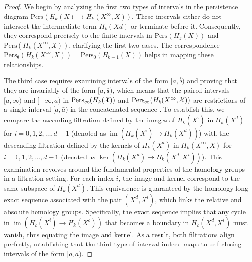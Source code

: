 \begin{proof}
	We begin by analyzing the first two types of intervals in the persistence diagram
	$\mathrm{Pers}(H_{k}(X) \to H_{k}(X^{\infty}, X))$. These intervals either do
	not intersect the intermediate term $H_{k}(X{d})$ or terminate before it. Consequently,
	they correspond precisely to the finite intervals in $\mathrm{Pers}(H_{k}(X))$
	and $\mathrm{Pers}(H_{k}(X^{\infty}, X))$, clarifying the first two cases. The
	correspondence $\mathrm{Pers}_{0}(H_{k}(X^{\infty}, X)) = \mathrm{Pers}_{0}(H_{k-1}(X))$
	helps in mapping these relationships.

	The third case requires examining intervals of the form $[a, \bar{b})$ and
	proving that they are invariably of the form $[a, \bar{a})$, which means that
	the paired intervals $[a,\infty)$ and $[-\infty,a)$ in $\mathrm{Pers}_{\infty}(
	H_{k}({\mathcal{X}}))$ and $\mathrm{Pers}_{\infty}(H_{k}(X^{\infty}, {\mathcal{X}}))$ are restrictions
	of a single interval $[a,\bar{a})$ in the concatenated sequence \cite[Proof of Proposition 2.5]{de2011dualities}.
	To establish this, we compare the ascending filtration defined by the images of
	$H_{k}(X^{i})$ in $H_{k}(X^{d})$ for $i = 0, 1, 2, \ldots, d-1$ (denoted as
	$\operatorname{im}(H_{k}(X^{i}) \to H_{k}(X^{d}))$) with the descending filtration defined
	by the kernels of $H_{k}(X^{d})$ in $H_{k}(X^{\infty}, X)$ for $i = 0, 1, 2, \ldots
	, d-1$ (denoted as $\ker(H_{k}(X^{d}) \to H_{k}(X^{d}, X^{i}))$). This
	examination revolves around the fundamental properties of the homology groups
	in a filtration setting. For each index $i$, the image and kernel correspond to the same subspace of $H_{k}
	(X^{d})$. This equivalence is guaranteed by the homology long exact sequence
	associated with the pair $(X^{d}, X^{i})$, which links the relative and absolute
	homology groups. Specifically, the exact sequence implies that any cycle in $\operatorname{im}
	(H_{k}(X^{i}) \to H_{k}(X^{d}))$ that becomes a boundary in $H_{k}(X^{d}, X^{i}
	)$ must vanish, thus equating the image and kernel. As a result, both
	filtrations align perfectly, establishing that the third type of interval indeed
	maps to self-closing intervals of the form $[a, \bar{a})$.
\end{proof}

